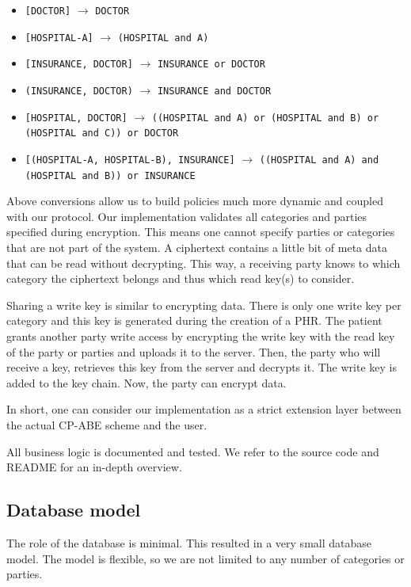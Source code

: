 \documentclass[a4paper]{article}
\begin{document}
		\begin{itemize}
			\item \texttt{[DOCTOR]} $\rightarrow$ \texttt{DOCTOR}
			\item \texttt{[HOSPITAL-A]} $\rightarrow$ \texttt{(HOSPITAL and A)}
			\item \texttt{[INSURANCE, DOCTOR]} $\rightarrow$ \texttt{INSURANCE or DOCTOR}
			\item \texttt{(INSURANCE, DOCTOR)} $\rightarrow$ \texttt{INSURANCE and DOCTOR}
			\item \texttt{[HOSPITAL, DOCTOR]} $\rightarrow$ \texttt{((HOSPITAL and A) or (HOSPITAL and B) or (HOSPITAL and C)) or DOCTOR}
			\item \texttt{[(HOSPITAL-A, HOSPITAL-B), INSURANCE]} $\rightarrow$ \texttt{((HOSPITAL and A) and (HOSPITAL and B)) or INSURANCE}
		\end{itemize}
		
		Above conversions allow us to build policies much more dynamic and coupled with our protocol. Our implementation validates all categories and parties specified during encryption. This means one cannot specify parties or categories that are not part of the system. A ciphertext contains a little bit of meta data that can be read without decrypting. This way, a receiving party knows to which category the ciphertext belongs and thus which read key(s) to consider.
		
		Sharing a write key is similar to encrypting data. There is only one write key per category and this key is generated during the creation of a PHR. The patient grants another party write access by encrypting the write key with the read key of the party or parties and uploads it to the server. Then, the party who will receive a key, retrieves this key from the server and decrypts it. The write key is added to the key chain. Now, the party can encrypt data.
		
		In short, one can consider our implementation as a strict extension layer between the actual CP-ABE scheme and the user.
				
		All business logic is documented and tested. We refer to the source code and README for an in-depth overview.
	
	\subsection{Database model}
		The role of the database is minimal. This resulted in a very small database model. The model is flexible, so we are not limited to any number of categories or parties.
		
\end{document}
